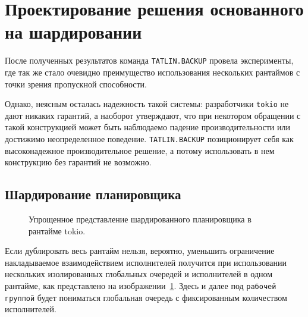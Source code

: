 
\section{Проектирование решения основанного на шардировании}

После полученных результатов команда \verb|TATLIN.BACKUP| провела эксперименты, где так же стало очевидно преимущество использования нескольких рантаймов с точки зрения пропускной способности.

Однако, неясным осталась надежность такой системы: разработчики \verb|tokio| не дают никаких гарантий, а наоборот утверждают, что при некотором обращении с такой конструкцией может быть наблюдаемо падение производительности или достижимо неопределенное поведение. \verb|TATLIN.BACKUP| позиционирует себя как высоконадежное производительное решение, а потому использовать в нем конструкцию без гарантий не возможно.

\subsection{Шардирование планировщика}

\begin{figure}[H]
    \begin{center}
    \end{center}

    \caption{Упрощенное представление шардированного планировщика в рантайме tokio.}
    \label{fig:tokio:duplicated_arch}
\end{figure}

Если дублировать весь рантайм нельзя, вероятно, уменьшить ограничение накладываемое взаимодействием исполнителей получится при использовании нескольких изолированных  глобальных очередей и исполнителей в одном рантайме, как представлено на изображении~\ref{fig:tokio:duplicated_arch}. Здесь и далее под \verb|рабочей группой| будет пониматься глобальная очередь с фиксированным количеством исполнителей.


